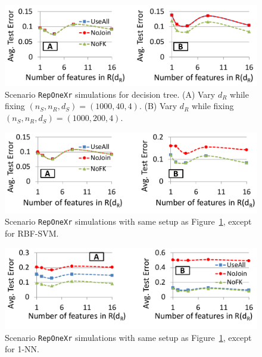 \documentclass{vldb}
\begin{document}
\begin{figure}[t]
\centering
\includegraphics[width=0.99\linewidth]{onexr_jerrydt.pdf}
\vspace{1mm}
\caption{Scenario \texttt{RepOneXr} simulations for decision tree. (A) Vary $d_R$ while fixing $(n_S, n_R, d_S) = (1000, 40, 4)$. 
(B) Vary $d_R$ while fixing $(n_S, n_R, d_S) = (1000, 200, 4)$.}
\label{Figure:OneXrjerry_dt}
\end{figure}

\begin{figure}[t]
\centering
\includegraphics[width=0.99\linewidth]{onexr_jerrysvm.pdf}
\vspace{1mm}
\caption{Scenario \texttt{RepOneXr} simulations with same setup as Figure~\ref{Figure:OneXrjerry_dt}, except for RBF-SVM.}
\label{Figure:OneXrjerry_svm}
\end{figure}

\begin{figure}[t]
\centering
\includegraphics[width=0.99\linewidth]{onexr_jerry1nn.pdf}
\vspace{1mm}
\caption{Scenario \texttt{RepOneXr} simulations with same setup as Figure~\ref{Figure:OneXrjerry_dt}, except for 1-NN.}
\label{Figure:OneXrjerry_1nn}
\end{figure}
\end{document}
